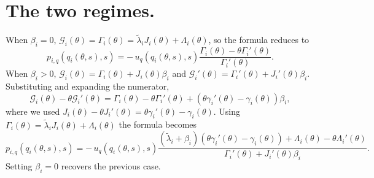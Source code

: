 \documentclass{class}
\begin{document}
\section{The two regimes.}
When $\beta_i = 0$, $\mathcal{G}_i(\theta) = \Gamma_i(\theta) = \tilde{\lambda}_i J_i(\theta) + \Lambda_i(\theta)$, so the formula reduces to
\[
p_{i,q}\!\left(q_i(\theta,s),s\right) = -\,u_q\!\left(q_i(\theta,s),s\right)\frac{\Gamma_i(\theta) - \theta\Gamma_i'(\theta)}{\Gamma_i'(\theta)}.
\]
When $\beta_i > 0$, $\mathcal{G}_i(\theta) = \Gamma_i(\theta) + J_i(\theta)\beta_i$ and $\mathcal{G}_i'(\theta) = \Gamma_i'(\theta) + J_i'(\theta)\beta_i$. Substituting and expanding the numerator,
\[
\mathcal{G}_i(\theta) - \theta\mathcal{G}_i'(\theta) = \Gamma_i(\theta) - \theta\Gamma_i'(\theta) + \left(\theta\gamma_i'(\theta) - \gamma_i(\theta)\right)\beta_i,
\]
where we used $J_i(\theta) - \theta J_i'(\theta) = \theta\gamma_i'(\theta) - \gamma_i(\theta)$. Using $\Gamma_i(\theta) = \tilde{\lambda}_i J_i(\theta) + \Lambda_i(\theta)$ the formula becomes
\[
p_{i,q}\!\left(q_i(\theta,s),s\right) = -\,u_q\!\left(q_i(\theta,s),s\right)\frac{\left(\tilde{\lambda}_i + \beta_i\right)\left(\theta\gamma_i'(\theta) - \gamma_i(\theta)\right) + \Lambda_i(\theta) - \theta\Lambda_i'(\theta)}{\Gamma_i'(\theta) + J_i'(\theta)\beta_i}.
\]
Setting $\beta_i = 0$ recovers the previous case.
\end{document}

